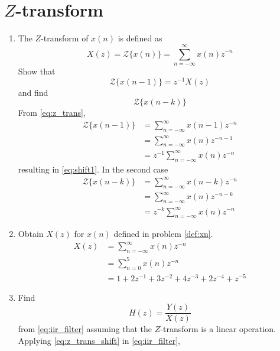 \documentclass[journal,12pt,twocolumn]{IEEEtran}
\renewcommand\thesection{\arabic{section}}
\begin{document}
\section{$Z$-transform}
\begin{enumerate}[label=\thesection.\arabic*]
\item The $Z$-transform of $x(n)$ is defined as
%
\begin{equation}
\label{eq:z_trans}
X(z)={\mathcal {Z}}\{x(n)\}=\sum _{n=-\infty }^{\infty }x(n)z^{-n}
\end{equation}
%
Show that
\begin{equation}
\label{eq:shift1}
{\mathcal {Z}}\{x(n-1)\} = z^{-1}X(z)
\end{equation}
and find
\begin{equation}
	{\mathcal {Z}}\{x(n-k)\} 
\end{equation}
\solution From \eqref{eq:z_trans},
\begin{align}
{\mathcal {Z}}\{x(n-1)\} &=\sum _{n=-\infty }^{\infty }x(n-1)z^{-n}
\\
&=\sum _{n=-\infty }^{\infty }x(n)z^{-n-1} \\&= z^{-1}\sum _{n=-\infty }^{\infty }x(n)z^{-n}
\end{align}
resulting in \eqref{eq:shift1}. In the second case
%
\begin{align}
\label{eq:z_trans_shift}
\mathcal {Z}\{x(n-k)\} &=\sum _{n=-\infty }^{\infty }x(n-k)z^{-n}\\
&= \sum _{n=-\infty }^{\infty }x(n)z^{-n-k}\\
&= z^{-k}\sum_{n=-\infty}^{\infty}x(n)z^{-n}
\end{align}
\item Obtain $X(z)$ for $x(n)$ defined in problem 
	\ref{def:xn}.\\
\solution \begin{align}
    X(z) &= \sum_{n=-\infty}^{\infty}x(n)z^{-n}\\
    &= \sum_{n=0}^{5}x(n)z^{-n}\\
    &= 1 + 2z^{-1} + 3z^{-2} +4z^{-3} + 2z^{-4}+z^{-5}
\end{align}	
	\item Find
%
\begin{equation}
H(z) = \frac{Y(z)}{X(z)}
\end{equation}
%
from  \eqref{eq:iir_filter} assuming that the $Z$-transform is a linear operation.
\\
\solution  Applying \eqref{eq:z_trans_shift} in \eqref{eq:iir_filter},
\begin{align}

\end{align}
\end{enumerate}
\end{document}
